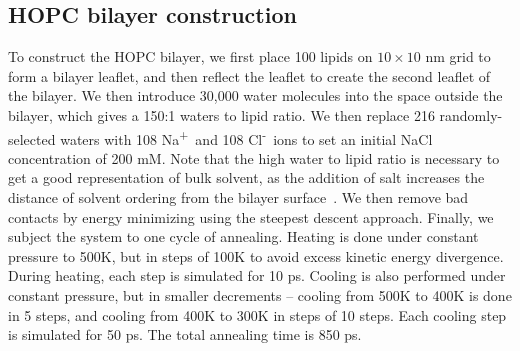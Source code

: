 \documentclass[12pt,openany,final]{book}
\newcommand{\na}{Na\textsuperscript{+}~}
\newcommand{\cl}{Cl\textsuperscript{-}~}
\begin{document}
\subsection{HOPC bilayer construction}
To construct the HOPC bilayer, we first place 100 lipids on $10 \times 10$ nm grid to form a bilayer leaflet, and then reflect the leaflet to 
create the second leaflet of the bilayer. We then introduce 30,000 water molecules into the space outside the bilayer, which gives a
 150:1 waters to lipid ratio. We then replace 216 randomly-selected waters with 108 \na and 108 \cl ions to set an initial 
NaCl concentration of 200 mM. Note that the high water to lipid ratio is necessary to get a good representation of bulk solvent, 
as the addition of salt increases the distance of solvent ordering from the bilayer surface~\cite{kruczek:2017}. We then 
remove bad contacts by energy minimizing using the steepest descent approach. Finally, we subject the system to one cycle of annealing. Heating 
is done under constant pressure to 500K, but in steps of 100K to avoid excess kinetic energy divergence. During heating, each step is simulated 
for 10 ps. Cooling is also performed under constant pressure, but in smaller decrements -- cooling from 500K to 
400K is done in 5 steps, and cooling from 400K to 300K in steps of 10 steps. Each cooling step is simulated for 50 ps. The total annealing time is 850 ps.
\end{document}
